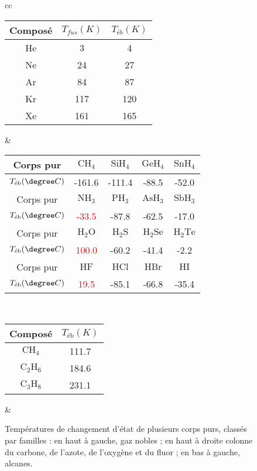 \documentclass[11pt,a4paper]{report}
\begin{document}
\begin{itemize}
\begin{figure}[h!]
	\begin{center}
	\begin{tabular}{cc}
	\begin{tabular}{|c|c|c|}
		\hline
		Composé & $T_{fus} (K)$ & $T_{éb} (K)$ \\
		\hline
		He & 3 & 4\\
		\hline
		Ne & 24 & 27\\
		\hline
		Ar & 84 & 87\\
		\hline
		Kr & 117 & 120\\
		\hline 
		Xe & 161 & 165\\
		\hline
	\end{tabular}	
	&
	\begin{tabular}{|c|c|c|c|c|}
		\hline
		Corps pur & $\text{CH}_4$ & $\text{SiH}_4$ & $\text{GeH}_4$ & $\text{SnH}_4$\\
		\hline
		$T_\text{éb} (\degree C)$ & -161.6 & -111.4 & -88.5 & -52.0 \\
		\hline
		\hline
		\hline
		Corps pur & $\text{NH}_3$ & $\text{PH}_3$ & $\text{AsH}_3$ & $\text{SbH}_3$\\
		\hline
		$T_\text{éb} (\degree C)$ & \textcolor{red}{-33.5} & -87.8 & -62.5 & -17.0\\
		\hline
		\hline
		\hline
		Corps pur & $\text{H}_2\text{O}$ & $\text{H}_2\text{S}$ 
			& $\text{H}_2\text{Se}$ & $\text{H}_2\text{Te}$\\
		\hline
		$T_\text{éb} (\degree C)$ & \textcolor{red}{100.0} & -60.2 & -41.4 & -2.2\\
		\hline
		\hline
		\hline
		Corps pur & $\text{HF}$ & $\text{HCl}$ & $\text{HBr}$ & $\text{HI}$\\
		\hline 
		$T_\text{éb} (\degree C)$ & \textcolor{red}{19.5} & -85.1 & -66.8 & -35.4\\
		\hline
	\end{tabular}
	\\
	\begin{tabular}{|c|c|}
		\hline
		Composé & $T_\text{éb} (K)$ \\
		\hline
		$\text{CH}_4$ & 111.7 \\
		\hline
		$\text{C}_2\text{H}_6$ & 184.6 \\
		\hline
		$\text{C}_3\text{H}_8$ & 231.1 \\
		\hline
	\end{tabular}
	& 
	\end{tabular}
	\end{center}
	\caption{Températures de changement d'état de plusieurs corps purs, classés par familles : en 			haut à gauche, gaz nobles ; en haut à droite colonne du carbone, de l'azote, de l'oxygène et du 		fluor ; en bas à gauche, alcanes.}
\end{figure}	
	

\end{itemize}
\end{document}
